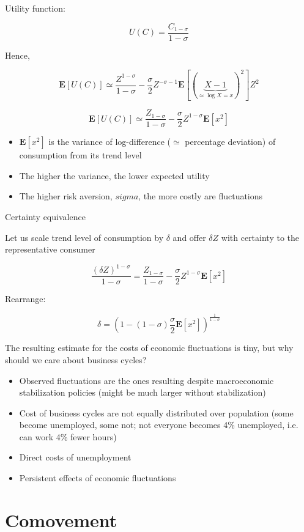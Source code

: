 \documentclass{article}
\begin{document}
Utility function:

\[U(C)=\frac{C_{1-\sigma}}{1-\sigma} \]

Hence,

\[\mathbf{E}[U(C)]\simeq\frac{Z^{1-\sigma}}{1-\sigma}-\frac{\sigma}{2}Z^{-\sigma-1}\mathbf{E}\left[(\underbrace{X-1}_{\simeq\log X=x})^2 \right]Z^2 \]

\[\mathbf{E}[U(C)]\simeq\frac{Z_{1-\sigma}}{1-\sigma}-\frac{\sigma}{2}Z^{1-\sigma}\mathbf{E}[x^2] \]

\begin{itemize}
    \item $\mathbf{E}[x^2]$ is the variance of log-difference ($\simeq$ percentage deviation) of consumption from its trend level
    \item The higher the variance, the lower expected utility
    \item The higher risk aversion, $sigma$, the more costly are fluctuations
\end{itemize}

Certainty equivalence

Let us scale trend level of consumption by $\delta$ and offer $\delta Z$ with certainty to the representative consumer

\[\frac{(\delta Z)^{1-\sigma}}{1-\sigma}=\frac{Z_{1-\sigma}}{1-\sigma}-\frac{\sigma}{2}Z^{1-\sigma}\mathbf{E}[x^2] \]

Rearrange:

\[\delta=\left(1-(1-\sigma)\frac{\sigma}{2}\mathbf{E}[x^2] \right)^{\frac{1}{1-\sigma}} \]

The resulting estimate for the costs of economic fluctuations is tiny, but why should we care about business cycles?

\begin{itemize}
    \item Observed fluctuations are the ones resulting despite macroeconomic stabilization policies (might be much larger without stabilization)
    \item Cost of business cycles are not equally distributed over population (some become unemployed, some not; not everyone becomes 4\% unemployed, i.e. can work 4\% fewer hours)
    \item Direct costs of unemployment
    \item Persistent effects of economic fluctuations
\end{itemize}

\section{Comovement}
\end{document}
